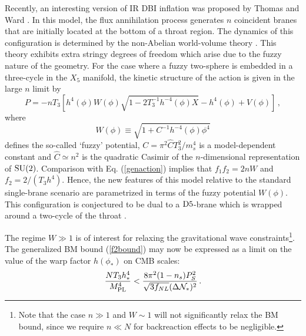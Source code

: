 Recently, an interesting version of IR DBI inflation 
was proposed by Thomas and Ward \cite{thomasward}. In this model, the flux annihilation process 
generates $n$ coincident branes that are initially located at the 
bottom of a throat region. The dynamics of this configuration
is determined by the non-Abelian world-volume theory \cite{myers1,myers2}. 
This theory exhibits extra stringy degrees of freedom which arise due to the 
fuzzy nature of the geometry. For the case where a fuzzy two-sphere is 
embedded in a three-cycle in the $X_5$ manifold, 
the kinetic structure of the action is given in the large $n$ limit by 
\cite{thomasward}
\begin{equation}
P=-nT_3 \left[ h^4(\phi ) W(\phi ) 
\sqrt{1-2 T_3^{-1} h^{-4}(\phi) X}
-h^4(\phi ) + V (\phi ) \right] \,,
\end{equation}
where   
\begin{equation} 
\label{defW}
W (\phi ) \equiv \sqrt{1+ C^{-1}h^{-4}(\phi ) \phi^4}
\end{equation}
defines the so-called `fuzzy' potential, 
$C = \pi^2 \hat{C}T_3^2/m_s^4$ is a model-dependent constant and 
$\hat{C} \simeq n^2$ 
is the quadratic Casimir of the $n$-dimensional representation of 
${\rm SU}(2)$. 
Comparison with Eq. (\ref{genaction}) 
implies that $f_1f_2 =2nW$ and $f_2=2/(T_3h^4)$. Hence, 
the new features of this model relative to the standard single-brane 
scenario are parametrized in terms of the fuzzy potential $W (\phi )$. 
This configuration is conjectured to be dual to 
a ${\rm D5}$-brane which is wrapped around a two-cycle 
of the throat \cite{dual1,dual2,dual3}. 

The regime $W \gg 1$ is of interest for 
relaxing the gravitational wave constraints\footnote{Note that 
the case $n \gg 1$ and
$W \sim 1$ will not significantly relax the BM bound, 
since we require $n \ll N$ for backreaction effects to be negligible.}. 
The generalized BM bound (\ref{f2bound}) may now be expressed as 
a limit on the value of the warp factor $h(\phi_*)$ on CMB scales: 
\begin{equation}
\label{warptorelax}
\frac{NT_3h^4_*}{M_{\mathrm{PL}}^4} < 
\frac{8\pi^2 (1-n_s)P_S^2}{\sqrt{3f_{NL}}(\Delta {\cal{N}}_*)^2} \,.
\end{equation}

